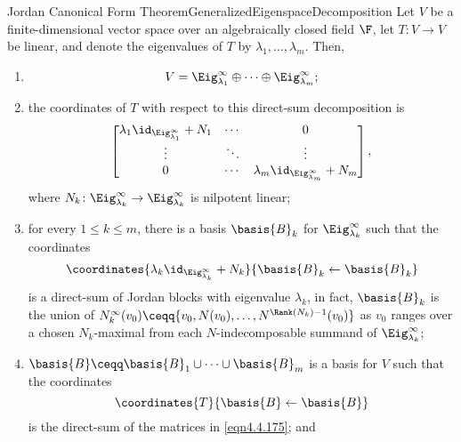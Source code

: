 \begin{thm}{Jordan Canonical Form Theorem}{GeneralizedEigenspaceDecomposition}
	Let $V$ be a finite-dimensional vector space over an algebraically closed field $\F$, let $T\colon V\rightarrow V$ be linear, and denote the eigenvalues of $T$ by $\lambda _1,\ldots ,\lambda _m$.  Then,
	\begin{enumerate}
		\item \label{GeneralizedEigenspaceDecomposition(i)}
		\begin{equation}\label{eqn4.4.173}
			V=\Eig _{\lambda _1}^{\infty}\oplus \cdots \oplus \Eig _{\lambda _m}^{\infty};
		\end{equation}
		\item \label{GeneralizedEigenspaceDecomposition(ii)}the coordinates of $T$ with respect to this direct-sum decomposition is
		\begin{equation}
			\begin{bmatrix}\lambda _1\id _{\Eig _{\lambda _1}^{\infty}}+N_1 & \cdots & 0 \\ \vdots & \ddots & \vdots \\ 0 & \cdots & \lambda _m\id _{\Eig _{\lambda _m}^{\infty}}+N_m\end{bmatrix},
		\end{equation}
		where $N_k\colon \Eig _{\lambda _k}^{\infty}\rightarrow \Eig _{\lambda _k}^{\infty}$ is nilpotent linear;
		\item \label{GeneralizedEigenspaceDecomposition(iii)}for every $1\leq k\leq m$, there is a basis $\basis{B}_k$ for $\Eig _{\lambda _k}^{\infty}$ such that the coordinates
		\begin{equation}\label{eqn4.4.175}
			\coordinates{\lambda _k\id _{\Eig _{\lambda _k}^{\infty}}+N_k}{\basis{B}_k\leftarrow \basis{B}_k}
		\end{equation}
		is a direct-sum of Jordan blocks with eigenvalue $\lambda _k$, in fact, $\basis{B}_k$ is the union of $N_k^{\infty}(v_0)\ceqq \{ v_0,N(v_0),\ldots ,N^{\Rank (N_k)-1}(v_0)\}$ as $v_0$ ranges over a chosen $N_k$-maximal from each $N$-indecomposable summand of $\Eig _{\lambda _k}^{\infty}$;
		\item \label{GeneralizedEigenspaceDecomposition(iv)}$\basis{B}\ceqq \basis{B}_1\cup \cdots \cup \basis{B}_m$ is a basis for $V$ such that the coordinates
		\begin{equation}\label{eqn4.4.176}
			\coordinates{T}{\basis{B}\leftarrow \basis{B}}
		\end{equation}
		is the direct-sum of the matrices in \eqref{eqn4.4.175}; and

\end{enumerate}
\end{thm}
